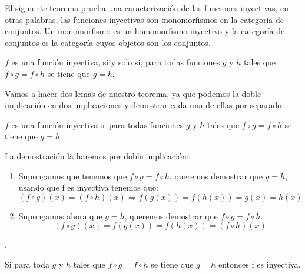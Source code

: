 %
\begin{isabellebody}%
%
%
\isadelimtheory
%
\endisadelimtheory
%
\isatagtheory
%
\endisatagtheory
{\isafoldtheory}%
%
\isadelimtheory
%
\endisadelimtheory
%
\isadelimdocument
%
\endisadelimdocument
%
\isatagdocument
%
\isamarkuptrue%
%
\endisatagdocument
{\isafolddocument}%
%
\isadelimdocument
%
\endisadelimdocument
%
\begin{isamarkuptext}%
El siguiente teorema prueba una caracterización de las funciones
 inyectivas, en otras palabras, las funciones inyectivas son
 monomorfismos en la categoría de conjuntos. Un monomorfismo es un
 homomorfismo inyectivo y la categoría de conjuntos es la categoría
 cuyos objetos son los conjuntos.
  
  \begin{teorema}
    $f$ es una función inyectiva, si y solo si, para todas funciones 
 $g$ y $h$  tales que  $f \circ g = f \circ h$ se tiene que $g = h$. 
  \end{teorema}

Vamos a hacer dos lemas de nuestro teorema, ya que podemos la doble 
implicación en dos implicaciones y demostrar cada una de ellas por
 separado.

\begin {lema}
$f$ es una función inyectiva si para todas funciones $g$ y $h$ tales que
 $f \circ g = f \circ h$ se tiene que $g = h.$
\end {lema}
  \begin{demostracion}
    La demostración la haremos por doble implicación: 
\begin {enumerate}
\item Supongamos que tenemos que $f \circ g = f \circ h$, queremos
 demostrar que $g = h$, usando que f es inyectiva tenemos que: \\
$$(f \circ g)(x) = (f \circ h)(x) \Longrightarrow f(g(x)) = f(h(x)) = 
g(x) = h(x)$$
\item Supongamos ahora que $g = h$, queremos demostrar que  $f \circ g
 = f \circ h$. \\
$$(f \circ g)(x) = f(g(x)) = f(h(x)) = (f \circ h)(x)$$
\end {enumerate}
.
  \end{demostracion}

\begin {lema} 
Si para toda $g$ y $h$ tales que $f \circ g =  f \circ h$ se tiene que $g
= h$ entonces f es inyectiva.
\end {lema} 


\end{isamarkuptext}
\end{isabellebody}

